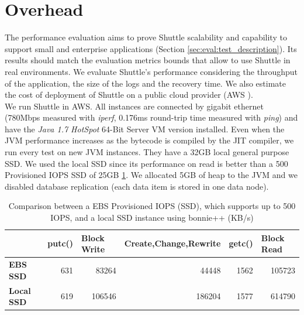 \section{Overhead}\label{sec:eval:peformance}

The performance evaluation aims to prove Shuttle scalability and capability to support small and enterprise applications (Section \ref{sec:eval:test_description}). Its results should match the evaluation metrics bounds that allow to use Shuttle in real environments. We evaluate Shuttle's performance considering the throughput of the application, the size of the logs and the recovery time. We also estimate the cost of deployment of Shuttle on a public cloud provider (AWS \cite{aws}). \\

We run Shuttle in \acf{AWS}. All instances are connected by gigabit ethernet (780Mbps measured with \emph{iperf}, 0.176ms round-trip time measured with \emph{ping}) and have the \emph{Java 1.7 HotSpot} 64-Bit Server \ac{VM} version installed. Even when the \ac{JVM} performance increases as the bytecode is compiled by the \ac{JIT} compiler, we run every test on new \ac{JVM} instances. They have a 32GB local general purpose \ac{SSD}. We used the local \ac{SSD} since its performance on read is better than a 500 Provisioned \ac{IOPS} \ac{SSD} of 25GB \ref{tab:disk_throughput}. We allocated 5GB of heap to the \ac{JVM} and we disabled database replication (each data item is stored in one data node).

\begin{table}[ht]
\centering
\begin{tabular}{l|rrrrr}
                   & \multicolumn{1}{l}{\textbf{putc()}} & \multicolumn{1}{l}{\textbf{Block Write}} & \multicolumn{1}{l}{\textbf{Create,Change,Rewrite}} & \multicolumn{1}{l}{\textbf{getc()}} & \multicolumn{1}{l}{\textbf{Block Read}}  \\ \hline
\textbf{EBS SSD}      & 631                                 & 83264                                    & 44448                                              & 1562                                & 105723                                  \\
\textbf{Local SSD} & 619                                 & 106546                                   & 186204                                             & 1577                                & 614790                                 
\end{tabular}
\caption[Comparison between a EBS Provisioned IOPS (SSD) and local SSD instance]{Comparison between a EBS Provisioned IOPS (SSD), which supports up to 500 IOPS, and a local SSD instance using bonnie++ (KB/s)}
\label{tab:disk_throughput}
\end{table}




